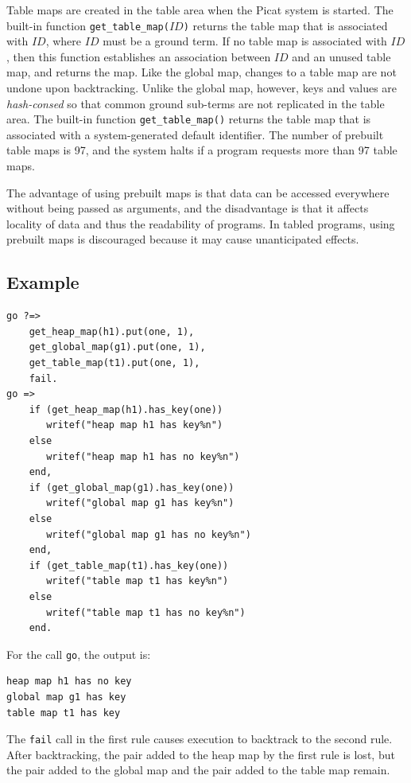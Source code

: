 Table maps  are created in the table area when the Picat system is started. The built-in function \texttt{get\_table\_map($ID$)} returns the table map that is associated with $ID$, where $ID$ must be a ground term. If no table map is associated with $ID$, then this function establishes an association between $ID$ and an unused table map, and returns the map. Like the global map, changes to a table map are not undone upon backtracking. Unlike the global map, however, keys and values are {\it hash-consed} so that common ground sub-terms are not replicated in the table area. The built-in function \texttt{get\_table\_map()} returns the table map that is associated with a system-generated default identifier. The number of prebuilt table maps is 97, and the system halts if a program requests more than 97 table maps.

The advantage of using prebuilt maps is that data can be accessed everywhere without being passed as arguments, and the disadvantage is that it affects locality of data and thus the readability of programs. In tabled programs, using prebuilt maps is discouraged because it may cause unanticipated effects.

\subsection*{Example}
\begin{verbatim}
go ?=>
    get_heap_map(h1).put(one, 1),
    get_global_map(g1).put(one, 1),
    get_table_map(t1).put(one, 1),
    fail.
go =>
    if (get_heap_map(h1).has_key(one))
       writef("heap map h1 has key%n") 
    else 
       writef("heap map h1 has no key%n")
    end,
    if (get_global_map(g1).has_key(one))
       writef("global map g1 has key%n") 
    else 
       writef("global map g1 has no key%n")
    end,
    if (get_table_map(t1).has_key(one))
       writef("table map t1 has key%n") 
    else 
       writef("table map t1 has no key%n")
    end.
\end{verbatim}
For the call \texttt{go}, the output is:
\begin{verbatim}
heap map h1 has no key
global map g1 has key
table map t1 has key
\end{verbatim}
The \texttt{fail} call in the first rule causes execution to backtrack to the second rule. After backtracking, the pair added to the heap map by the first rule is lost, but the pair added to the global map and the pair added to the table map remain.

